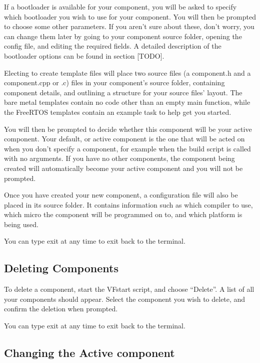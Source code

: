 \documentclass[a4paper, oneside, 11pt, titlepage, onecolumn, openright]{report}
\begin{document}
If a bootloader is available for your component, you will be asked to specify which bootloader you wish to use for your component. You will then be prompted to choose some other parameters. If you aren't sure about these, don't worry, you can change them later by going to your component source folder, opening the config file, and editing the required fields. A detailed description of the bootloader options can be found in section [TODO].

Electing to create template files will place two source files (a component.h and a component.cpp or .c) files in your component's source folder, containing component details, and outlining a structure for your source files' layout. The bare metal templates contain no code other than an empty main function, while the FreeRTOS templates contain an example task to help get you started.

You will then be prompted to decide whether this component will be your active component. Your default, or active component is the one that will be acted on when you don't specify a component, for example when the build script is called with no arguments. If you have no other components, the component being created will automatically become your active component and you will not be prompted.

Once you have created your new component, a configuration file will also be placed in its source folder. It contains information such as which compiler to use, which micro the component will be programmed on to, and which platform is being used.

You can type exit at any time to exit back to the terminal.

				\subsection{Deleting Components}
					\label{ss:Getting Started:Using The Toolchain:Deleting Components}

					To delete a component, start the VFstart script, and choose ``Delete''. A list of all your components should appear. Select the component you wish to delete, and confirm the deletion when prompted.

You can type exit at any time to exit back to the terminal.

				\subsection{Changing the Active component}
					\label{ss:Getting Started:Using The Toolchain:Changing the Active component}
\end{document}
